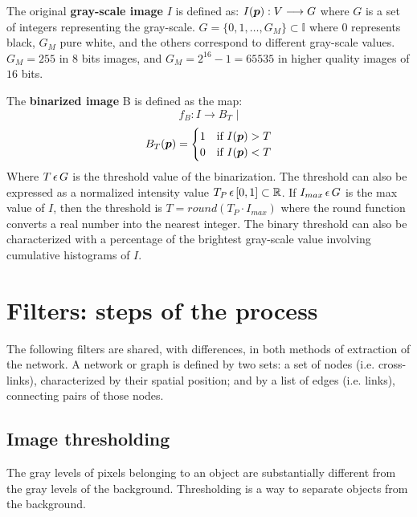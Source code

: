  The original \textbf{gray-scale image} $I$ is defined as:
 $I(\boldsymbol{p}):V \longrightarrow G$ where
 $G$ is a set of integers representing the gray-scale.
 $G=\{0,1,\ldots,G_M\}\subset\mathbb{I}$ where $0$ represents black, $G_M$
pure white, and the others correspond to different gray-scale values. $G_M=255$
in $8$ bits images, and $G_M=2^{16} - 1 = 65535$ in higher quality images of $16$ bits. 

The \textbf{binarized image} B is defined as the map:
$$f_B: I \longrightarrow B_T \,\,|$$ 
\begin{equation}
 B_T(\boldsymbol{p})=
   \begin{cases} 
     1               & \mbox{if } I(\boldsymbol{p}) > T   \\
     0               & \mbox{if } I(\boldsymbol{p}) < T
   \end{cases}
   \label{eq:bin}
\end{equation}
Where $T\,\epsilon \,{}G$ is the threshold value of the binarization. The threshold can also be expressed as
a normalized intensity value $T_P \,\epsilon \,{}[0,1]\subset \mathbb{R}$. If 
$I_{max}\,\epsilon \,{}G$ is the max value of $I$, then the threshold  is
$T=round(T_P \cdot I_{max})$  where the round function converts a real number
into the nearest integer. The binary threshold can also be characterized with a percentage of the
brightest gray-scale value involving
cumulative histograms of $I$.

\section{Filters: steps of the process}
The following filters are shared, with differences, in both methods of
extraction of the network. A network or graph is defined by two sets:
a set of nodes (i.e. cross-links), characterized by their spatial position; and
by a list of edges (i.e. links), connecting pairs of those nodes.
\subsection{Image thresholding}
The gray levels of pixels belonging to an object are substantially
different from the gray levels of the background. Thresholding is a way to
separate objects from the background.

